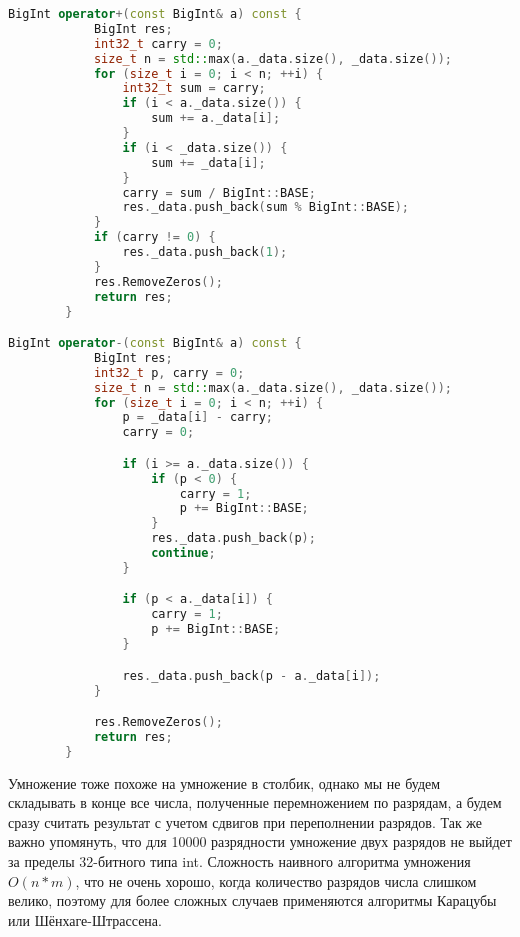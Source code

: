 \begin{lstlisting}[language=c++]
BigInt operator+(const BigInt& a) const {
            BigInt res;
            int32_t carry = 0;
            size_t n = std::max(a._data.size(), _data.size());
            for (size_t i = 0; i < n; ++i) {
                int32_t sum = carry;
                if (i < a._data.size()) {
                    sum += a._data[i];
                }
                if (i < _data.size()) {
                    sum += _data[i];
                }
                carry = sum / BigInt::BASE;
                res._data.push_back(sum % BigInt::BASE);
            }
            if (carry != 0) {
                res._data.push_back(1);
            }
            res.RemoveZeros();
            return res;
        }

BigInt operator-(const BigInt& a) const {
            BigInt res;
            int32_t p, carry = 0;
            size_t n = std::max(a._data.size(), _data.size());
            for (size_t i = 0; i < n; ++i) {
                p = _data[i] - carry;
                carry = 0;

                if (i >= a._data.size()) {
                    if (p < 0) {
                        carry = 1;
                        p += BigInt::BASE;
                    }
                    res._data.push_back(p);
                    continue;
                }

                if (p < a._data[i]) {
                    carry = 1;
                    p += BigInt::BASE;
                }

                res._data.push_back(p - a._data[i]);
            }

            res.RemoveZeros();
            return res;
        }
\end{lstlisting}
\pagebreak
Умножение тоже похоже на умножение в столбик, однако мы не будем складывать в конце все числа, полученные перемножением по разрядам, а будем сразу считать результат с учетом сдвигов при переполнении разрядов. Так же важно упомянуть, что для 10000 разрядности умножение двух разрядов не выйдет за пределы 32-битного типа int. Сложность наивного алгоритма умножения $O(n*m)$, что не очень хорошо, когда количество разрядов числа слишком велико, поэтому для более сложных случаев применяются алгоритмы Карацубы или Шёнхаге-Штрассена.

